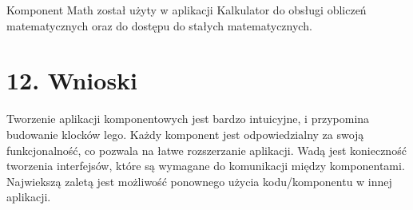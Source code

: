 \documentclass{article}
\begin{document}
Komponent Math został użyty w aplikacji Kalkulator do obsługi obliczeń matematycznych oraz do dostępu do stałych matematycznych.

\section*{12. Wnioski}

Tworzenie aplikacji komponentowych jest bardzo intuicyjne, i przypomina budowanie klocków lego.
Każdy komponent jest odpowiedzialny za swoją funkcjonalność, co pozwala na łatwe rozszerzanie aplikacji.
Wadą jest konieczność tworzenia interfejsów, które są wymagane do komunikacji między komponentami.
Najwiekszą zaletą jest możliwość ponownego użycia kodu/komponentu w innej aplikacji.
\end{document}
